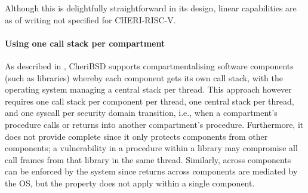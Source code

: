 \documentclass[main.tex]{subfiles}
\begin{document}
Although this  is delightfully straightforward in its design, linear capabilities are as of writing not specified for CHERI-RISC-V.

\paragraph{Using one call stack per compartment} As described in \cite{compartment}, CheriBSD supports compartmentalising software components (such as libraries) whereby each component gets its own call stack, with the operating system managing a central stack per thread. This approach however requires one call stack per component per thread, one central stack per thread, and one syscall per security domain transition, i.e., when a compartment's procedure calls or returns into another compartment's procedure. Furthermore, it does not provide complete  since it only protects components from other components; a vulnerability in a procedure within a library may compromise all call frames from that library in the same thread. Similarly,  across components can be enforced by the system since returns across components are mediated by the OS, but the property does not apply within a single component.

\biblio{}
\onlyinsubfile{\glsaddall\printglossaries}
\end{document}
